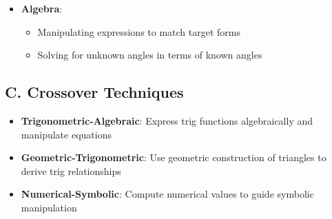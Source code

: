 \documentclass[11pt]{article}
\begin{document}
\begin{tacticalbox}
\begin{itemize}[leftmargin=*]
    \item \textbf{Algebra}: 
    \begin{itemize}
        \item Manipulating expressions to match target forms
        \item Solving for unknown angles in terms of known angles
    \end{itemize}
\end{itemize}

\subsection*{C. Crossover Techniques}
\begin{itemize}[leftmargin=*]
    \item \textbf{Trigonometric-Algebraic}: Express trig functions algebraically and manipulate equations
    
    \item \textbf{Geometric-Trigonometric}: Use geometric construction of triangles to derive trig relationships
    
    \item \textbf{Numerical-Symbolic}: Compute numerical values to guide symbolic manipulation
\end{itemize}
\end{tacticalbox}
\end{document}
